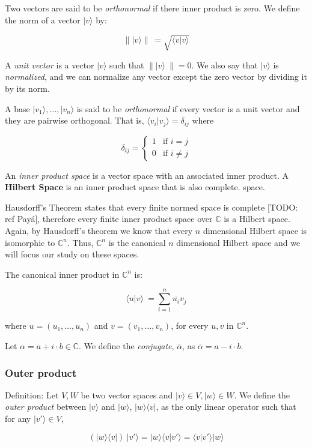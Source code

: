 Two vectors are said to be \emph{orthonormal} if there inner product is zero. We define the norm of a vector $|v\rangle$ by:

$$\parallel |v\rangle \parallel \ = \sqrt{ \langle v|v\rangle }$$

A \emph{unit vector} is a vector $|v\rangle$ such that $\parallel |v\rangle \  \parallel = 0 $. We also say that $|v\rangle$ is \emph{normalized}, and we can normalize any vector except the zero vector by dividing it by its norm.

A base $|v_1\rangle, \dotsc, |v_n\rangle$ is said to be \emph{orthonormal} if every vector is a unit vector and they are pairwise orthogonal. That is, $\langle v_i|v_j\rangle = \delta_{ij}$ where

\[
\delta_{ij} = 
\begin{cases}
	1 & \text{if } i = j  \\
	0 & \text{if } i \neq j
\end{cases}
\]

\begin{definition}
	An \emph{inner product space} is a vector space with an associated inner product. A \textbf{Hilbert Space} is an inner product space that is also complete. space.
\end{definition}

Hausdorff's Theorem states that every finite normed space is complete [TODO: ref Payá], therefore every finite inner product space over $\mathds{C}$ is a Hilbert space. Again, by Hausdorff's theorem we know that every $n$ dimensional Hilbert space is isomorphic to $\mathds{C}^n$. Thus, $\mathds{C}^n$ is the canonical $n$ dimensional Hilbert space and we will focus our study on these spaces.

The canonical inner product in $\mathds{C}^n$ is:

$$ \langle u|v \rangle \ = \sum_{i=1}^n \overline{u_i}v_j $$

where $u = (u_1, \dotsc, u_n)$ and $v = (v_1, \dotsc, v_n)$, for every $u,v$ in $\mathds{C}^n$.

Let $\alpha = a + i \cdot b\in \mathds{C}$. We define the \emph{conjugate}, $\bar \alpha$, as $\bar \alpha = a - i \cdot b$.

\subsubsection{Outer product}

\begin{definition}
	Definition: Let $V, W$ be two vector spaces and $|v\rangle \in V, |w\rangle \in W$. We define the \emph{outer product} between $|v\rangle$ and $|w\rangle$, $|w\rangle\langle v|$, as the only linear operator such that for any $|v'\rangle \in V$, 
	
	$$ (|w\rangle\langle v|) \ |v'\rangle = |w\rangle\langle v|v'\rangle = \langle v|v'\rangle |w\rangle$$
\end{definition}

